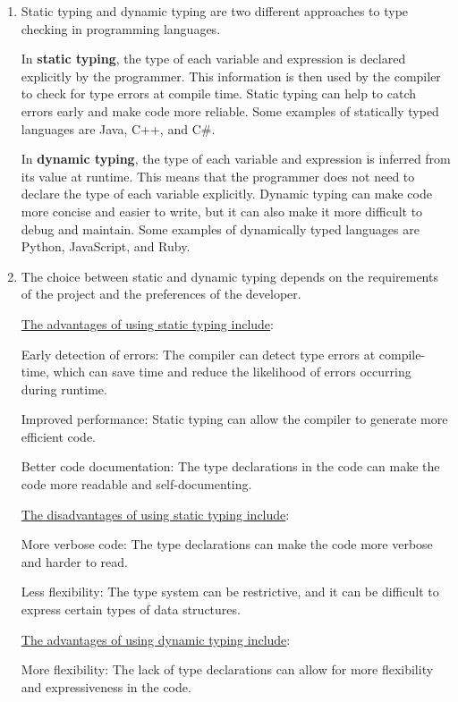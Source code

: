 \documentclass[letterpaper,11pt]{article}
\newcounter{problemid}
\def\newproblem{\clearpage\newpage{\bf Problem~\arabic{problemid}\stepcounter{problemid}}\hfill\par}
\begin{document}
\newproblem 
\begin{enumerate}

    \item Static typing and dynamic typing are two different approaches to type checking in programming languages.

    In \textbf{static typing}, the type of each variable and expression is declared explicitly by the programmer. This information is then used by the compiler to check for type errors at compile time. Static typing can help to catch errors early and make code more reliable. Some examples of statically typed languages are Java, C++, and C\#.
    
    In \textbf{dynamic typing}, the type of each variable and expression is inferred from its value at runtime. This means that the programmer does not need to declare the type of each variable explicitly. Dynamic typing can make code more concise and easier to write, but it can also make it more difficult to debug and maintain. Some examples of dynamically typed languages are Python, JavaScript, and Ruby.
    
    \item The choice between static and dynamic typing depends on the requirements of the project and the preferences of the developer.

    \underline{The advantages of using static typing include}:

    Early detection of errors: The compiler can detect type errors at compile-time, which can save time and reduce the likelihood of errors occurring during runtime.
    
    Improved performance: Static typing can allow the compiler to generate more efficient code.
    
    Better code documentation: The type declarations in the code can make the code more readable and self-documenting.
    
    \underline{The disadvantages of using static typing include}:

    More verbose code: The type declarations can make the code more verbose and harder to read.
    
    Less flexibility: The type system can be restrictive, and it can be difficult to express certain types of data structures.
    
    \underline{The advantages of using dynamic typing include}:

    More flexibility: The lack of type declarations can allow for more flexibility and expressiveness in the code.
    

\end{enumerate}
\end{document}
